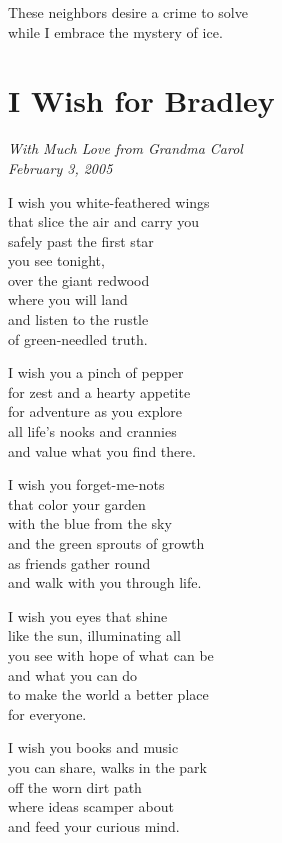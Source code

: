\documentclass[twoside,10pt]{book}
\begin{document}
These neighbors desire a crime to solve\\
while I embrace the mystery of ice.


\clearpage
\section{I Wish for Bradley}

\emph{With Much Love from Grandma Carol\\
February 3, 2005}

I wish you white-feathered wings\\
that slice the air and carry you\\
safely past the first star\\
you see tonight,\\
over the giant redwood\\
where you will land\\
and listen to the rustle\\
of green-needled truth.

I wish you a pinch of pepper\\
for zest and a hearty appetite\\
for adventure as you explore\\
all life's nooks and crannies\\
and value what you find there.

I wish you forget-me-nots\\
that color your garden\\
with the blue from the sky\\
and the green sprouts of growth\\
as friends gather round\\
and walk with you through life.

I wish you eyes that shine\\
like the sun, illuminating all\\
you see with hope of what can be\\
and what you can do\\
to make the world a better place\\
for everyone.

I wish you books and music\\
you can share, walks in the park\\
off the worn dirt path\\
where ideas scamper about\\
and feed your curious mind.
\end{document}
